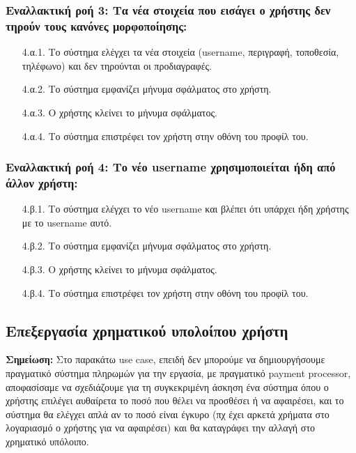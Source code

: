 \documentclass[12pt,a4paper]{article}
\begin{document}
\subsubsection*{Εναλλακτική ροή 3: Τα νέα στοιχεία που εισάγει ο χρήστης δεν τηρούν τους κανόνες μορφοποίησης:}
\begin{enumerate}
    \item [4.α.1.] Το σύστημα ελέγχει τα νέα στοιχεία (username, περιγραφή, τοποθεσία, τηλέφωνο) και δεν τηρούνται οι προδιαγραφές.
    \item [4.α.2.] Το σύστημα εμφανίζει μήνυμα σφάλματος στο χρήστη.
    \item [4.α.3.] Ο χρήστης κλείνει το μήνυμα σφάλματος.
    \item [4.α.4.] Το σύστημα επιστρέφει τον χρήστη στην οθόνη του προφίλ του.
\end{enumerate}

\subsubsection*{Εναλλακτική ροή 4: Το νέο username χρησιμοποιείται ήδη από άλλον χρήστη:}
\begin{enumerate}
    \item [4.β.1.] Το σύστημα ελέγχει το νέο username και βλέπει ότι υπάρχει ήδη χρήστης με το username αυτό. 
    \item [4.β.2.] Το σύστημα εμφανίζει μήνυμα σφάλματος στο χρήστη.  
    \item [4.β.3.] Ο χρήστης κλείνει το μήνυμα σφάλματος.
    \item [4.β.4.] Το σύστημα επιστρέφει τον χρήστη στην οθόνη του προφίλ του.
\end{enumerate}

\subsection{Επεξεργασία χρηματικού υπολοίπου χρήστη}

\textbf{Σημείωση:} Στο παρακάτω use case, επειδή δεν μπορούμε να δημιουργήσουμε πραγματικό σύστημα πληρωμών για την εργασία, με πραγματικό payment processor, αποφασίσαμε να σχεδιάζουμε για τη συγκεκριμένη άσκηση ένα σύστημα όπου ο χρήστης επιλέγει αυθαίρετα το ποσό που θέλει να προσθέσει ή να αφαιρέσει, και το σύστημα θα ελέγχει απλά αν το ποσό είναι έγκυρο (πχ έχει αρκετά χρήματα στο λογαριασμό ο χρήστης για να αφαιρέσει) και θα καταγράφει την αλλαγή στο χρηματικό υπόλοιπο.
\end{document}
